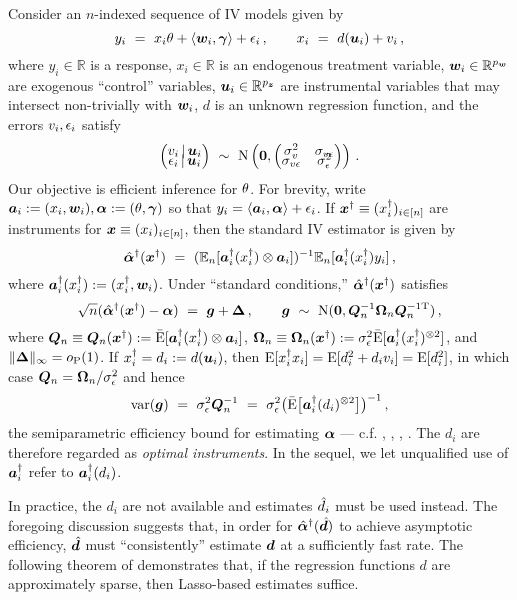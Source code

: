 \documentclass{uwstat572}
\newcommand{\be}{\begin{equation}}
\newcommand{\ee}{\end{equation}}
\newcommand{\benn}{\begin{equation*}}
\newcommand{\eenn}{\end{equation*}}
\theoremstyle{definition}
\theoremstyle{remark}
\newcommand{\R}{\ensuremath{\mathbb{R}}}
\newcommand{\Prb}{\mathrm{P}}
\newcommand{\E}{\mathrm{E}}
\newcommand{\En}{\bar{\E}}
\newcommand{\Ex}{\mathbb{E}}
\newcommand{\Exn}{\Ex_n}
\newcommand{\var}{\mathrm{var}}
\newcommand{\Normal}{\mathrm{N}}
\newcommand{\bs}[1]{\boldsymbol{#1}}
\numberwithin{equation}{section}
\begin{document}
Consider an $n$-indexed sequence of IV models given by
\be\label{mod:iv}
	y_i \ = \ x_i\regt + \langle\w_i, \regg\rangle + \ersi\,, \qquad x_i \ = \ d(\u_i) + \erfi \,,
\ee
where $y_i \in \R$ is a response, $x_i \in \R$ is an endogenous treatment variable, $\w_i\in\R^{\pw}$ are exogenous ``control'' variables, $\u_i \in \R^{\pz}$ are instrumental variables that may intersect non-trivially with $\w_i$, $d$ is an unknown regression function, and the errors $v_i, \epsilon_i$ satisfy
\benn
	\begin{pmatrix} \erfi \,|\, \u_i \\[-.5em] \ersi \,|\, \u_i \end{pmatrix} \ \sim \ \Normal\left(\bs{0}, \begin{pmatrix} \sdf^2 & \sdfs \\[-.5em] \sdfs & \sds^2 \end{pmatrix} \right)\,.
\eenn
Our objective is efficient inference for $\theta$. For brevity, write $\a_i := (x_i, \w_i), \rega := (\regt, \regg)$ so that $y_i = \langle \a_i, \rega \rangle + \ersi$. If $\xinst \equiv (\xinsti)_{i\inn}$ are instruments for $\x \equiv (x_i)_{i\inn}$, then the standard IV estimator is given by
\be\label{def:regaiv}
	\regaiv(\xinst) \ = \ (\Exn[\ainsti(\xinsti) \kp \a_i])^{-1}\Exn[\ainsti(\xinsti) y_i] \,,
\ee
where $\ainst_i(\xinsti) := (\xinsti, \w_i)$. Under ``standard conditions,'' $\regaiv(\xinst)$ satisfies
\benn
	\sqrt{n}(\regaiv(\xinst) - \rega) \ = \ \g + \rm\,, \qquad \g \ \sim \ \Normal(\bs{0}, \Qn^{-1}\Omn\Qn^{-1\tp})\,,
\eenn
where $\Qn \equiv \Qn(\xinst) := \En[\ainst_i(\xinsti) \kp \a_i]$, $\Omn \equiv \Omn(\xinst) := \sds^2\En[\ainsti(\xinsti)^{\kpt}]$, and $\|\rm\|_\infty = o_{\Prb}(1)$. If $\xinsti = d_i := d(\u_i)$, then $\E[\xinsti x_i] = \E[d_i^2 + d_i\erfi] = \E[d_i^2]$, in which case $\Qn = \Omn/\sds^2$ and hence
\benn
	\var(\g) \ = \ \sds^2\Qn^{-1} \ = \ \sds^2\big(\En\big[\ainsti(d_i)^{\kpt}\big]\big)^{-1} \,,
\eenn
the semiparametric efficiency bound for estimating $\rega$ --- c.f. \cite{BCCH12}, \cite{A74}, \cite{C87}, \cite{N90}. The $d_i$ are therefore regarded as \emph{optimal instruments}. In the sequel, we let unqualified use of $\ainsti$ refer to $\ainsti(d_i)$. 

In practice, the $d_i$ are not available and estimates $\hat{d}_i$ must be used instead. The foregoing discussion suggests that, in order for $\regaiv(\dhat)$ to achieve asymptotic efficiency, $\dhat$ must ``consistently'' estimate $\d$ at a sufficiently fast rate. The following theorem of \cite{BCH11} demonstrates that, if the regression functions $d$ are approximately sparse, then Lasso-based estimates suffice.
\end{document}
